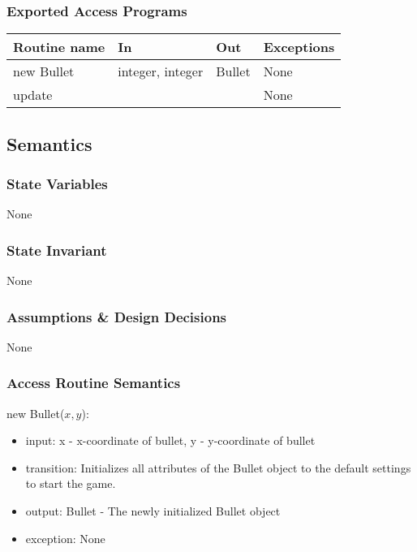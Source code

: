 \documentclass[12pt, titlepage]{article}
\begin{document}
\subsubsection* {Exported Access Programs}

\begin{tabular}{| l | l | l | p{5cm} |}
\hline
\textbf{Routine name} & \textbf{In} & \textbf{Out} & \textbf{Exceptions}\\
\hline
new Bullet & integer, integer & Bullet & None\\
\hline
update & & & None\\
\hline
\end{tabular}

\subsection* {Semantics}

\subsubsection* {State Variables}

None

\subsubsection* {State Invariant}

None

\subsubsection* {Assumptions \& Design Decisions}

None

\subsubsection* {Access Routine Semantics}

\noindent new Bullet($x, y$):
\begin{itemize}
\item input: x - x-coordinate of bullet, y - y-coordinate of bullet
\item transition: Initializes all attributes of the Bullet object to the default settings to start the game.
\item output: Bullet - The newly initialized Bullet object
\item exception: None
\end{itemize}
\end{document}
